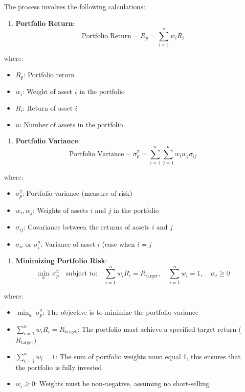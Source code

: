 \documentclass[
]{article}
\providecommand{\tightlist}{%
  \setlength{\itemsep}{0pt}\setlength{\parskip}{0pt}}
\begin{document}
The process involves the following calculations:

\begin{enumerate}
\def\labelenumi{\arabic{enumi}.}
\tightlist
\item
  \textbf{Portfolio Return}: \[
  \text{Portfolio Return} = R_p = \sum_{i=1}^{n} w_i R_i
  \]
\end{enumerate}

where:

\begin{itemize}
\tightlist
\item
  \(R_p\): Portfolio return
\item
  \(w_i\): Weight of asset \(i\) in the portfolio
\item
  \(R_i\): Return of asset \(i\)
\item
  \(n\): Number of assets in the portfolio
\end{itemize}

\begin{enumerate}
\def\labelenumi{\arabic{enumi}.}
\setcounter{enumi}{1}
\tightlist
\item
  \textbf{Portfolio Variance}: \[
  \text{Portfolio Variance} = \sigma_p^2 = \sum_{i=1}^{n} \sum_{j=1}^{n} w_i w_j \sigma_{ij}
  \]
\end{enumerate}

where:

\begin{itemize}
\tightlist
\item
  \(\sigma_p^2\): Portfolio variance (measure of risk)
\item
  \(w_i, w_j\): Weights of assets \(i\) and \(j\) in the portfolio
\item
  \(\sigma_{ij}\): Covariance between the returns of assets \(i\) and
  \(j\)
\item
  \(\sigma_{ii}\) or \(\sigma_i^2\): Variance of asset \(i\) (case when
  \(i = j\)
\end{itemize}

\begin{enumerate}
\def\labelenumi{\arabic{enumi}.}
\setcounter{enumi}{2}
\tightlist
\item
  \textbf{Minimizing Portfolio Risk}: \[
  \min_{w} \, \sigma_p^2 \quad \text{subject to:} \quad \sum_{i=1}^{n} w_i R_i = R_{\text{target}}, \quad \sum_{i=1}^{n} w_i = 1, \quad w_i \geq 0
  \]
\end{enumerate}

where:

\begin{itemize}
\tightlist
\item
  \(\min_{w} \, \sigma_p^2\): The objective is to minimize the portfolio
  variance
\item
  \(\sum_{i=1}^{n} w_i R_i = R_{\text{target}}\): The portfolio must
  achieve a specified target return (\(R_{\text{target}}\))
\item
  \(\sum_{i=1}^{n} w_i = 1\): The sum of portfolio weights must equal 1,
  this ensures that the portfolio is fully invested
\item
  \(w_i \geq 0\): Weights must be non-negative, assuming no
  short-selling
\end{itemize}
\end{document}

